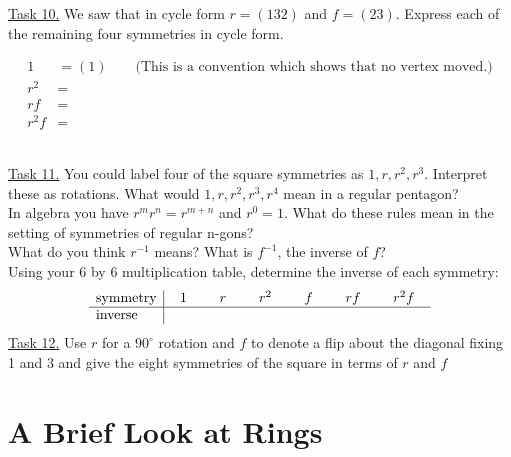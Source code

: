 \documentclass[12pt]{book}
\theoremstyle{definition}
\begin{document}
\underline{Task 10.}  We saw that in cycle form $r=(132)$ and $f=(23)$.  Express each of the remaining four symmetries in cycle form.\\
\begin{minipage}{6in}\begin{equation*}\begin{split}
1 &= (1) \qquad \text{(This is a convention which shows that no vertex moved.)}\\
r^2 &=\\
rf &=\\
r^2f &=
\end{split}\end{equation*}\end{minipage}\\[.1in]
\underline{Task 11.}  You could label four of the square symmetries as $1, r, r^2, r^3$.  Interpret these as rotations.  What would $1, r, r^2, r^3,r^4$ mean in a regular pentagon?\\[.2in]
In algebra you have $r^mr^n=r^{m+n}$ and $r^0 = 1$.  What do these rules mean in the setting of symmetries of regular n-gons?\\[.2in]
What do you think $r^{-1}$ means?  What is $f^{-1}$, the inverse of $f$?\\[.2in]
Using your 6 by 6 multiplication table, determine the inverse of each symmetry:\\
$$\begin{array}{l | cccccc}
\text{symmetry} & ~~1~~&~~r~~&~~r^2~~&~~f~~&~~rf~~&~~r^2f~~\\
\hline
\text{inverse}&
\end{array}$$
\underline{Task 12.}  Use $r$ for a $90^\circ$ rotation and $f$ to denote a flip about the diagonal fixing 1 and 3 and give the eight symmetries of the square in terms of $r$ and $f$\\

\begin{flushright}
  
\end{flushright}

\section{A Brief Look at Rings}
\end{document}
